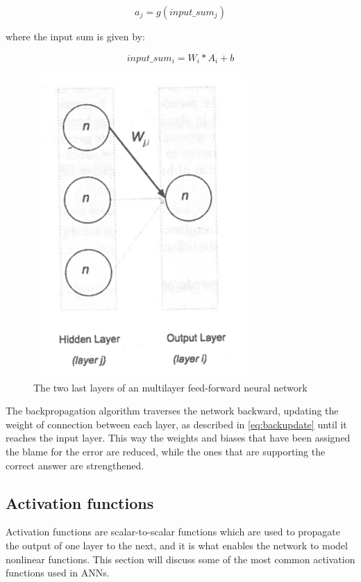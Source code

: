 \begin{equation}\label{eq:activation}
a_{j} = g(input\_sum_{j})
\end{equation}

where the input sum is given by:

\begin{equation}\label{eq:inputsum}
	input\_sum_{i} = W_{i}*A_{i}+b
\end{equation}

\begin{figure}[!h]
	\centering
	\includegraphics[scale=1]{fig/backpropagation_two_layers.png}
	\caption{The two last layers of an multilayer feed-forward neural network \cite{Patterson2017}}
	\label{fig:backpropagationtwolayers}
\end{figure}

The backpropagation algorithm traverses the network backward, updating the weight of connection between each layer, as described in \autoref{eq:backupdate} until it reaches the input layer. This way the weights and biases that have been assigned the blame for the error are reduced, while the ones that are supporting the correct answer are strengthened.

\subsection{Activation functions}
Activation functions are scalar-to-scalar functions which are used to propagate the output of one layer to the next, and it is what enables the network to model nonlinear functions. This section will discuss some of the most common activation functions used in ANNs.

